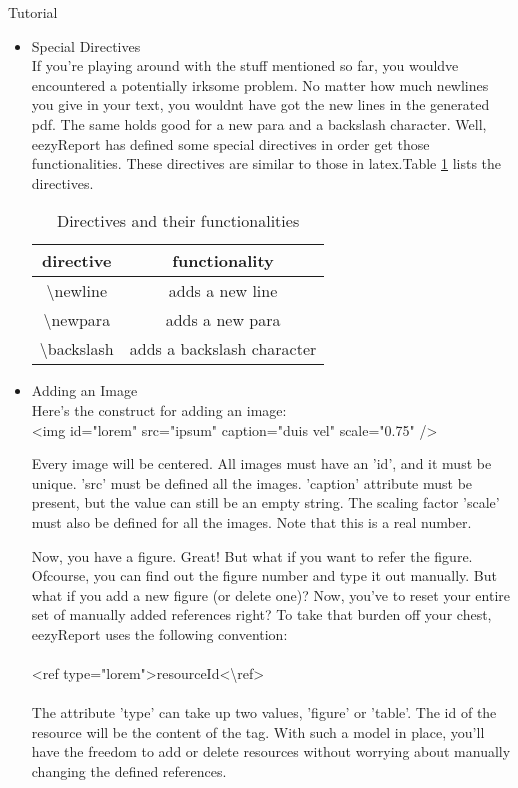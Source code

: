 \documentclass{report}
\begin{document}
\begin{projChapter}{Tutorial}
\begin{itemize}
  \item Special Directives
                ~\\
                If you're playing around with the stuff mentioned so far, you wouldve encountered a potentially irksome problem. No matter how much newlines you give in your text, you wouldnt have got the new lines in the generated pdf. The same holds good for a new para and a backslash character. Well, eezyReport has defined some special directives in order get those functionalities. These directives are similar to those in latex.Table \ref{table1} lists the directives.
                \begin{table}[h]\begin{center}\begin{tabular}{|c|c|}\hline
\textbf{directive} & \textbf{functionality} \\
\hline
\hline
\textbackslash newline & adds a new line \\
\hline
\textbackslash newpara & adds a new para \\
\hline
\textbackslash backslash & adds a backslash character \\
\hline
\end{tabular}\end{center}\caption{Directives and their functionalities}\label{table1}\end{table}

  \item Adding an Image
                ~\\
                Here's the construct for adding an image:
                ~\\
                \textless img id="lorem" src="ipsum" caption="duis vel" scale="0.75" /\textgreater 

                Every image will be centered. All images must have an 'id', and it must be unique. 'src' must be defined all the images. 'caption' attribute must be present, but the value can still be an empty string. The scaling factor 'scale' must also be defined for all the images. Note that this is a real number.

                Now, you have a figure. Great! But what if you want to refer the figure. Ofcourse, you can find out the figure number and type it out manually. But what if you add a new figure (or delete one)? Now, you've to reset your  entire set of manually added references right? To take that burden off your chest, eezyReport uses the following convention:
                ~\\\\
                \textless ref type="lorem"\textgreater resourceId\textless \textbackslash ref\textgreater 
                ~\\\\
                The attribute 'type' can take up two values, 'figure' or 'table'. The id of the resource will be the content of the tag. With such a model in place, you'll have the freedom to add or delete resources without worrying about manually changing the defined references.
            

\end{itemize}
\end{projChapter}
\end{document}
